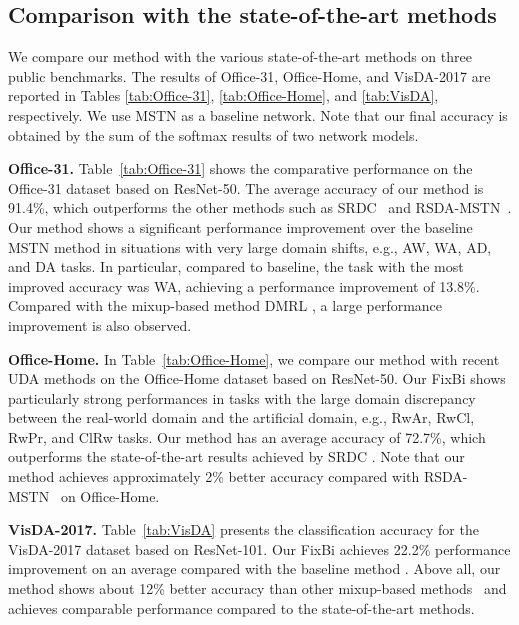 \documentclass[final]{cvpr}
\begin{document}
\subsection{Comparison with the state-of-the-art methods}
We compare our method with the various state-of-the-art methods on three public benchmarks. The results of Office-31, Office-Home, and VisDA-2017 are reported in Tables \ref{tab:Office-31}, \ref{tab:Office-Home}, and \ref{tab:VisDA}, respectively. We use MSTN \cite{MSTN} as a baseline network. Note that our final accuracy is obtained by the sum of the softmax results of two network models. 

\textbf{Office-31.} Table~\ref{tab:Office-31} shows the comparative performance on the Office-31 dataset based on ResNet-50. The average accuracy of our method is 91.4\%, which outperforms the other methods such as SRDC~\cite{SRDC} and RSDA-MSTN~\cite{Gu2020}. Our method shows a significant performance improvement over the baseline MSTN \cite{MSTN} method in situations with very large domain shifts, e.g., AW, WA, AD, and DA tasks. In particular, compared to baseline, the task with the most improved accuracy was WA, achieving a performance improvement of 13.8\%. Compared with the mixup-based method DMRL \cite{Wu2020}, a large performance improvement is also observed. 

\textbf{Office-Home.} In Table~\ref{tab:Office-Home}, we compare our method with recent UDA methods on the Office-Home dataset based on ResNet-50. Our FixBi shows particularly strong performances in tasks with the large domain discrepancy between the real-world domain and the artificial domain, e.g., RwAr, RwCl, RwPr, and ClRw tasks. Our method has an average accuracy of 72.7\%, which outperforms the state-of-the-art results achieved by SRDC \cite{SRDC}. Note that our method achieves approximately 2\% better accuracy compared with RSDA-MSTN~\cite{Gu2020} on Office-Home.

\textbf{VisDA-2017.} Table~\ref{tab:VisDA} presents the classification accuracy for the VisDA-2017 dataset based on ResNet-101. Our FixBi achieves 22.2\% performance improvement on an average compared with the baseline method \cite{MSTN}. Above all, our method shows about 12\% better accuracy than other mixup-based methods~\cite{Wu2020, Minghao2020} and achieves comparable performance compared to the state-of-the-art methods.
\end{document}
